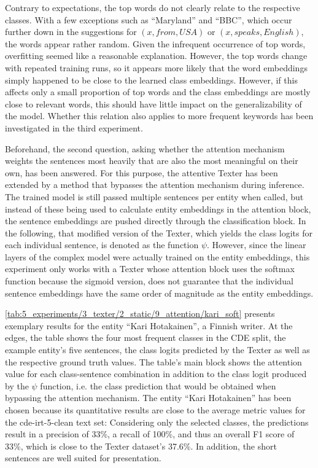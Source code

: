 Contrary to expectations, the top words do not clearly relate to the respective classes. With a few exceptions such as ``Maryland'' and ``BBC'', which occur further down in the suggestions for $(x, from, USA)$ or $(x, speaks, English)$, the words appear rather random. Given the infrequent occurrence of top words, overfitting seemed like a reasonable explanation. However, the top words change with repeated training runs, so it appears more likely that the word embeddings simply happened to be close to the learned class embeddings. However, if this affects only a small proportion of top words and the class embeddings are mostly close to relevant words, this should have little impact on the generalizability of the model. Whether this relation also applies to more frequent keywords has been investigated in the third experiment.

Beforehand, the second question, asking whether the attention mechanism weights the sentences most heavily that are also the most meaningful on their own, has been answered. For this purpose, the attentive Texter has been extended by a method that bypasses the attention mechanism during inference. The trained model is still passed multiple sentences per entity when called, but instead of these being used to calculate entity embeddings in the attention block, the sentence embeddings are pushed directly through the classification block. In the following, that modified version of the Texter, which yields the class logits for each individual sentence, is denoted as the function $\psi$. However, since the linear layers of the complex model were actually trained on the entity embeddings, this experiment only works with a Texter whose attention block uses the softmax function because the sigmoid version, does not guarantee that the individual sentence embeddings have the same order of magnitude as the entity embeddings.

\autoref{tab:5_experiments/3_texter/2_static/9_attention/kari_soft} presents exemplary results for the entity ``Kari Hotakainen'', a Finnish writer. At the edges, the table shows the four most frequent classes in the CDE split, the example entity's five sentences, the class logits predicted by the Texter as well as the respective ground truth values. The table's main block shows the attention value for each class-sentence combination in addition to the class logit produced by the $\psi$ function, i.e. the class prediction that would be obtained when bypassing the attention mechanism. The entity ``Kari Hotakainen'' has been chosen because its quantitative results are close to the average metric values for the cde-irt-5-clean text set: Considering only the selected classes, the predictions result in a precision of 33\%, a recall of 100\%, and thus an overall F1 score of 33\%, which is close to the Texter dataset's 37.6\%. In addition, the short sentences are well suited for presentation.

